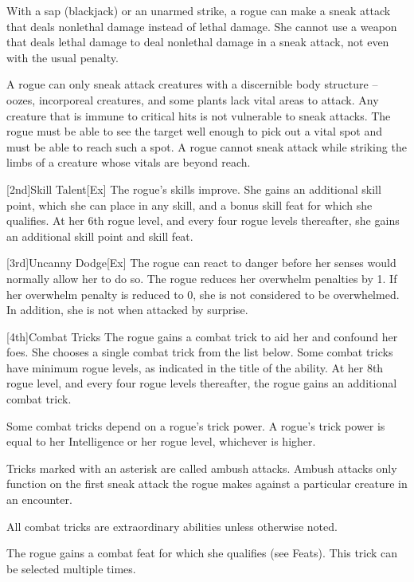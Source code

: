         With a sap (blackjack) or an unarmed strike, a rogue can make a sneak attack that deals nonlethal damage instead of lethal damage.
        She cannot use a weapon that deals lethal damage to deal nonlethal damage in a sneak attack, not even with the usual  penalty.

        A rogue can only sneak attack creatures with a discernible body structure -- oozes, incorporeal creatures, and some plants lack vital areas to attack.
        Any creature that is immune to critical hits is not vulnerable to sneak attacks.
        The rogue must be able to see the target well enough to pick out a vital spot and must be able to reach such a spot.
        A rogue cannot sneak attack while striking the limbs of a creature whose vitals are beyond reach.

        [2nd]{Skill Talent}[Ex]
        The rogue's skills improve.
        She gains an additional skill point, which she can place in any skill, and a bonus skill feat for which she qualifies.
        At her 6th rogue level, and every four rogue levels thereafter, she gains an additional skill point and skill feat.

        [3rd]{Uncanny Dodge}[Ex]
        The rogue can react to danger before her senses would normally allow her to do so.
        The rogue reduces her overwhelm penalties by 1.
        If her overwhelm penalty is reduced to 0, she is not considered to be overwhelmed.
        In addition, she is not \unaware when attacked by surprise.

        [4th]{Combat Tricks}
        The rogue gains a combat trick to aid her and confound her foes.
        She chooses a single combat trick from the list below.
        Some combat tricks have minimum rogue levels, as indicated in the title of the ability.
        At her 8th rogue level, and every four rogue levels thereafter, the rogue gains an additional combat trick.

        Some combat tricks depend on a rogue's trick power.
        A rogue's trick power is equal to her Intelligence or her rogue level, whichever is higher.

        Tricks marked with an asterisk are called ambush attacks.
        Ambush attacks only function on the first sneak attack the rogue makes against a particular creature in an encounter.

        All combat tricks are extraordinary abilities unless otherwise noted.

        The rogue gains a combat feat for which she qualifies (see Feats).
        This trick can be selected multiple times.

